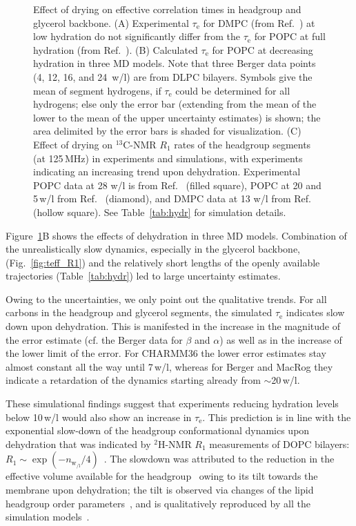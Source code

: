 \documentclass[journal=jcisd8,manuscript=article,layout=twocolumn]{achemso}
\begin{document}
\begin{figure}[ht!]
\caption{Effect of drying on %
effective correlation times %
in headgroup and glyc\-er\-ol backbone.
(A) Experimental $\tau_\mathrm e$ for
DMPC (from Ref.~) at low hydration %
do not significantly differ from the
$\tau_\mathrm e$ for POPC at full hydration (from Ref.~). %
(B) Calculated $\tau_\mathrm e$  for
POPC at decreasing hydration in three MD models.
Note that three Berger data points (4, 12, 16, and 24~w/l) are from DLPC bilayers.
Symbols give the mean of segment hydrogens,
if $\tau_\mathrm{e}$ could be determined for all hydrogens; else only the error bar
(extending from the mean of the lower to the mean of the upper uncertainty estimates) is shown;
the area delimited by the error bars is shaded for visualization. (C) Effect of drying on $^{13}$C-NMR $R_1$ rates of the headgroup segments (at 125\,MHz)
in experiments and simulations, with experiments indicating an increasing trend upon dehydration. Experimental POPC data at 28 w/l is from Ref.~ (filled square), POPC at 20 and 5\,w/l from Ref.~ (diamond), and DMPC data at 13 w/l from Ref.~ (hollow square). 
See Table~\ref{tab:hydr} for simulation details.}
\label{fig:hydration}
\end{figure}

Figure~\ref{fig:hydration}B shows the effects of dehydration in three MD models.
Combination of
the unrealistically slow dynamics, especially in the glycerol backbone, (Fig.~\ref{fig:teff_R1}) and
the relatively short lengths of the openly available trajectories %
(Table~\ref{tab:hydr})
led to large uncertainty estimates. %
%

Owing to the uncertainties, we only point out the qualitative trends. For all carbons in the headgroup and glycerol segments, the simulated  $\tau_\mathrm e$ indicates slow down upon dehydration. This is manifested in the increase in the magnitude of the error estimate (cf. the Berger data for $\beta$ and $\alpha$) as well as in the increase of the lower limit of the error. 
For CHARMM36 the lower error estimates stay almost constant all the way until 7\,w/l, whereas for Berger and MacRog they indicate a retardation of the dynamics starting already from $\sim$20\,w/l.

These simulational findings suggest that
experiments reducing hydration levels below 10\,w/l would also show an increase in $\tau_\mathrm e$.
This prediction is in line with the
exponential slow-down
of the headgroup conformational dynamics
upon dehydration that was indicated by $^2$H-NMR $R_{1}$ measurements
of DOPC bilayers:
$R_1\sim\exp(-n_{{\mathrm w\!}_{/\mathrm l}}/4)$~\cite{ulrich94}.
%
The slowdown was attributed to the reduction in the effective volume available for the headgroup~\cite{ulrich94}
owing to its tilt towards the membrane upon dehydration;
the tilt is observed via changes of the lipid headgroup order parameters~\cite{bechinger91},
and is qualitatively reproduced by all the simulation models~\cite{botan15}.
\end{document}
